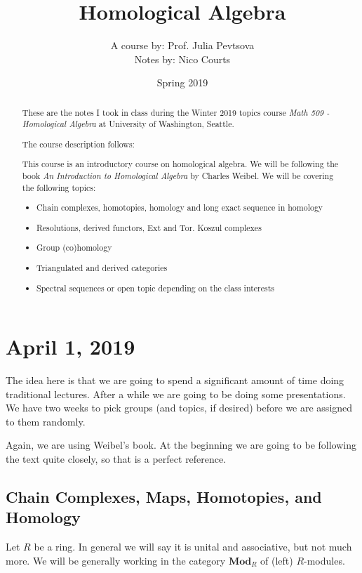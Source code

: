 \documentclass[12pt]{article}
\begin{document}
\title{Homological Algebra\vspace{-1ex}}
\author{A course by: Prof. Julia Pevtsova\\
Notes by: Nico Courts}
\date{Spring 2019}
\maketitle

\renewcommand{\abstractname}{Introduction}
\begin{abstract}
	These are the notes I took in class during the Winter 2019 topics course
	\textit{Math 509 - Homological Algebra} at University of Washington, Seattle. 
	
	The course description follows:

	\brk

	This course is an introductory course on homological algebra. We will be following the 
	book \textit{An Introduction to Homological Algebra} by Charles Weibel. We will be
	covering the following topics:

\begin{itemize}
	\item Chain complexes, homotopies, homology and long exact sequence in homology
	\item Resolutions, derived functors, Ext and Tor. Koszul complexes
	\item Group (co)homology
	\item Triangulated and derived categories
	\item Spectral sequences or open topic depending on the class interests
\end{itemize}
\end{abstract}

\section{April 1, 2019}

The idea here is that we are going to spend a significant amount of time doing traditional lectures.
After a while we are going to be doing some presentations. We have two weeks to pick groups
(and topics, if desired) before we are assigned to them randomly.

Again, we are using Weibel's book. At the beginning we are going to be following the text quite closely,
so that is a perfect reference.

\subsection{Chain Complexes, Maps, Homotopies, and Homology}
Let $R$ be a ring. In general we will say it is unital and associative, but not much more.
We will be generally working in the category $\mathbf{Mod}_R$ of (left) $R$-modules.
\end{document}
